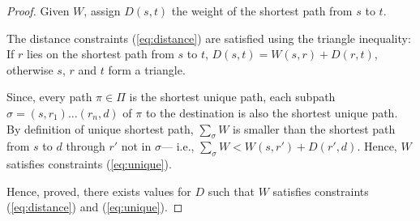 \begin{proof}
Given $W$, assign $D(s,t)$ the weight of the shortest 
path from $s$ to $t$. 

The distance constraints (\ref{eq:distance}) are satisfied using
the triangle inequality: If $r$ lies on the shortest path from $s$ to
$t$, $D(s,t) = W(s,r) + D(r,t)$, otherwise $s$, $r$ and $t$  form a 
triangle. 

Since, every path $\pi \in \Pi$ is the shortest unique path, each subpath 
$\sigma = (s, r_1)\ldots(r_n, d)$ 
of $\pi$ to the destination is also the shortest unique path. By 
definition of unique shortest path, $\sum_\sigma W$ is smaller than the shortest path
from $s$ to $d$ through $r'$ not in $\sigma$---
i.e., $\sum_\sigma W < W(s, r') + D(r', d)$. Hence, $W$ satisfies constraints 
(\ref{eq:unique}). 

Hence, proved, there exists values for $D$ such that $W$ satisfies constraints (\ref{eq:distance}) and (\ref{eq:unique}). 
\end{proof}